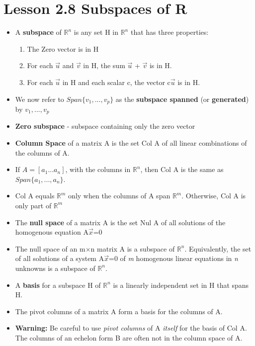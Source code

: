 \documentclass{report}
\newcommand{\Ax}{A$\vec{x}$}
\newcommand{\mxn}{m$\times$n}
\newcommand{\Rn}{$\mathbb{R}^n$}
\newcommand{\Rm}{$\mathbb{R}^m$}
\begin{document}
\section{Lesson 2.8 Subspaces of R}
	\begin{itemize}\addtolength{\leftskip}{2em}
		\item A \textbf{subspace} of {\Rn} is any set H in {\Rn} that has three properties: 
		\begin{enumerate}\addtolength{\leftskip}{4em}
		\item The Zero vector is in H
		\item For each $\vec{u}$ and $\vec{v}$ in H, the sum $\vec{u}$ + $\vec{v}$ is in H.
		\item For each $\vec{u}$ in H and each scalar c, the vector c$\vec{u}$ is in H.
		\end{enumerate}
		\item We now refer to $Span\{v_1,...,v_p\}$ as the \textbf{subspace spanned} (or \textbf{generated}) by $v_1,...,v_p$
		\item \textbf{Zero subspace }- subspace containing only the zero vector
		\item \textbf{Column Space} of a matrix A is the set Col A of all linear combinations of the columns of A.
		\item If $A=[a_1 ... a_n]$, with the columns in {\Rn}, then Col A is the same as $Span\{a_1,...,a_n\}$. 
		\item Col A equals {\Rm} only when the columns of A span {\Rm}. Otherwise, Col A is only part of {\Rm}
		\item The \textbf{null space} of a matrix A is the set Nul A of all solutions of the homogenous equation {\Ax}=0
		\item The null space of an {\mxn} matrix A is a subspace of {\Rn}. Equivalently, the set of all solutions of a system {\Ax}=0 of \textit{m} homogenous linear equations in \textit{n} unknowns is a subspace of {\Rn}.
		\item A \textbf{basis} for a subspace H of {\Rn} is a linearly independent set in H that spans H.
		\item The pivot columns of a matrix A form a basis for the columns of A.
		\item \textbf{Warning:} Be careful to use \textit{pivot columns} of A \textit{itself} for the basis of Col A. The columns of an echelon form B are often not in the column space of A.
	\end{itemize}
	
	\newpage
\end{document}
